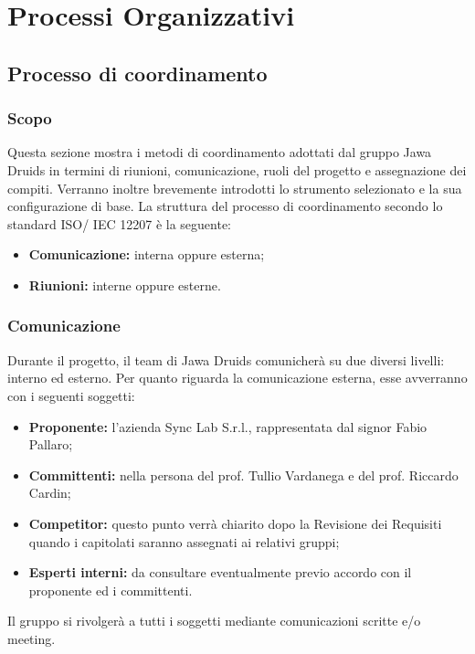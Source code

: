 \chapter{Processi Organizzativi}\label{Processi Organizzativi}

\section{Processo di coordinamento}\label{4.1}

\subsection{Scopo}\label{4.1.1}
Questa sezione mostra i metodi di coordinamento adottati dal gruppo Jawa Druids in termini di riunioni, comunicazione, ruoli del progetto e assegnazione dei compiti. Verranno inoltre brevemente introdotti lo strumento selezionato e la sua configurazione di base. La struttura del processo di coordinamento secondo lo standard ISO/ IEC 12207 è la seguente:
\begin{itemize}
	\item \textbf{Comunicazione:} interna oppure esterna;
	\item \textbf{Riunioni:} interne oppure esterne.
\end{itemize}
\subsection{Comunicazione}\label{4.1.2}
Durante il progetto, il team di Jawa Druids comunicherà su due diversi livelli: interno ed esterno.
Per quanto riguarda la comunicazione esterna, esse avverranno con i seguenti soggetti:
\begin{itemize}
\item \textbf{Proponente:} l'azienda Sync Lab S.r.l., rappresentata dal signor Fabio Pallaro;
	\item \textbf{Committenti:} nella persona del prof. Tullio Vardanega e del prof. Riccardo Cardin;
		\item \textbf{Competitor:} questo punto verrà chiarito dopo la Revisione dei Requisiti quando i capitolati saranno assegnati ai relativi gruppi;
			\item \textbf{Esperti interni:} da consultare eventualmente previo accordo con il proponente ed i committenti.
\end{itemize}
Il gruppo si rivolgerà a tutti i soggetti mediante comunicazioni scritte e/o meeting.
